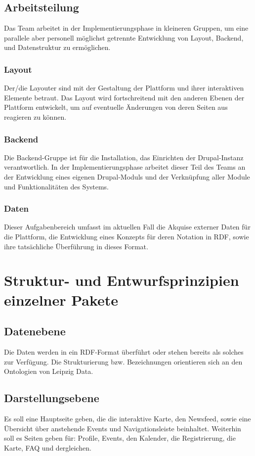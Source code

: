 \documentclass{swp}
\begin{document}
\subsection{Arbeitsteilung}
Das Team arbeitet in der Implementierungsphase in kleineren Gruppen, um eine parallele aber personell m\"oglichst getrennte Entwicklung von Layout, Backend, und Datenstruktur zu erm\"oglichen.
\subsubsection{Layout}
Der/die Layouter sind mit der Gestaltung der Plattform und ihrer interaktiven Elemente betraut. Das Layout wird fortschreitend mit den anderen Ebenen der Plattform entwickelt, um auf eventuelle \"Anderungen von deren Seiten aus reagieren zu k\"onnen.
\subsubsection{Backend}
Die Backend-Gruppe ist f\"ur die Installation, das Einrichten der Drupal-Instanz verantwortlich. In der Implementierungsphase arbeitet dieser Teil des Teams an der Entwicklung eines eigenen Drupal-Moduls und der Verkn\"upfung aller Module und Funktionalit\"aten des Systems.
\subsubsection{Daten}
Dieser Aufgabenbereich umfasst im aktuellen Fall die \glqq Akquise\grqq{} externer Daten f\"ur die Plattform, die Entwicklung eines Konzepts f\"ur deren Notation in RDF, sowie ihre tats\"achliche \"Uberf\"uhrung in dieses Format.
\section{Struktur- und Entwurfsprinzipien einzelner Pakete}
\subsection{Datenebene}
Die Daten werden in ein RDF-Format \"uberf\"uhrt oder stehen bereits als solches zur Verf\"ugung. Die Strukturierung bzw. Bezeichnungen orientieren sich an den Ontologien von Leipzig Data. 
\subsection{Darstellungsebene}
Es soll eine Hauptseite geben, die die interaktive Karte, den Newsfeed, sowie eine \"Ubersicht \"uber anstehende Events und Navigationsleiste beinhaltet. Weiterhin soll es Seiten geben f\"ur: Profile, Events, den Kalender, die Registrierung, die Karte, FAQ und dergleichen.
\end{document}

